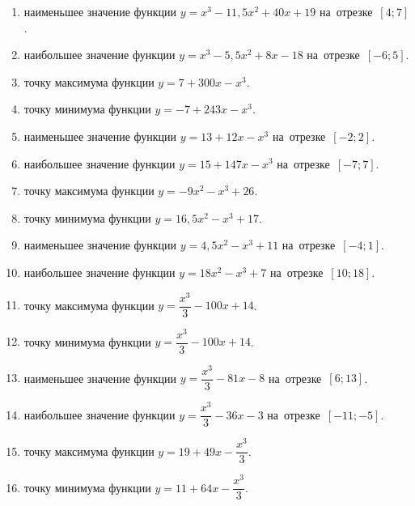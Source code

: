 \documentclass[a4paper,10pt]{article}
\begin{document}
\begin{enumerate}
\item {} наименьшее значение функции $y=x^3 -11,5x^2+40x+19$ на~отрезке~$\left[4;7\right]$.

\item {} наибольшее значение функции $y=x^3 -5,5x^2+8x-18$ на~отрезке~$\left[-6;5\right]$.

\item {} точку максимума функции $y=7+300x-x^3$.

\item {} точку минимума функции $y=-7+243x-x^3$.

\item {} наименьшее значение функции $y=13+12x-x^3$ на~отрезке~$\left[-2;2\right]$.

\item {} наибольшее значение функции $y=15+147x-x^3$ на~отрезке~$\left[-7;7\right]$.

\item {} точку максимума функции $y=-9x^2-x^3+26$.

\item {} точку минимума функции $y=16,5x^2-x^3+17$.

\item {} наименьшее значение функции $y=4,5x^2-x^3+11$ на~отрезке~$\left[-4;1\right]$.

\item {} наибольшее значение функции $y=18x^2-x^3+7$ на~отрезке~$\left[10;18\right]$.

\item {} точку максимума функции $y=\dfrac{x^3}{3} -100x+14$.

\item {} точку минимума функции $y=\dfrac{x^3}{3} -100x+14$.

\item {} наименьшее значение функции $y=\dfrac{x^3}{3} -81x-8$ на~отрезке~$\left[6;13\right]$.

\item {} наибольшее значение функции $y=\dfrac{x^3}{3} -36x-3$ на~отрезке~$\left[-11;-5\right]$.

\item {} точку максимума функции $y=19 +49x-\dfrac{x^3}{3}$.

\item {} точку минимума функции $y=11 +64x-\dfrac{x^3}{3}$.


\end{enumerate}
\end{document}
